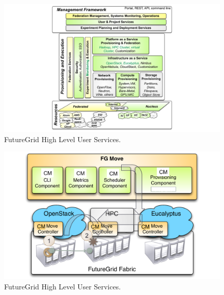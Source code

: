 \documentclass{article}
\begin{document}
\begin{figure}[h!]
  \caption{FutureGrid High Level User Services.}
  \centering
    \includegraphics[width=1.0\textwidth]{images/cm-arch.pdf}
\end{figure}

\begin{figure}[h!]
  \caption{FutureGrid High Level User Services.}
  \centering
    \includegraphics[width=1.0\textwidth]{images/shift2.pdf}
\end{figure}
\end{document}

